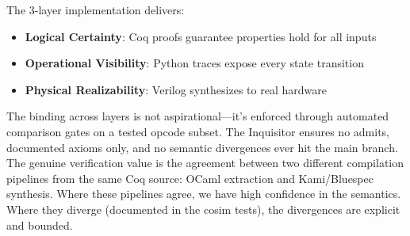 The 3-layer implementation delivers:
\begin{itemize}
    \item \textbf{Logical Certainty}: Coq proofs guarantee properties hold for all inputs
    \item \textbf{Operational Visibility}: Python traces expose every state transition
    \item \textbf{Physical Realizability}: Verilog synthesizes to real hardware
\end{itemize}

The binding across layers is not aspirational---it's enforced through automated comparison gates on a tested opcode subset. The Inquisitor ensures no admits, documented axioms only, and no semantic divergences ever hit the main branch. The genuine verification value is the agreement between two different compilation pipelines from the same Coq source: OCaml extraction and Kami/Bluespec synthesis. Where these pipelines agree, we have high confidence in the semantics. Where they diverge (documented in the cosim tests), the divergences are explicit and bounded.
